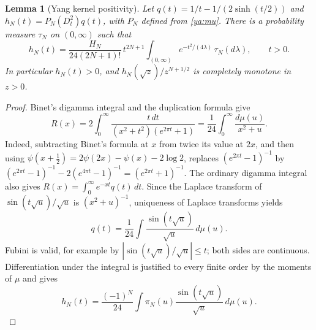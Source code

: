 \documentclass[11pt,a4paper]{article}
\newtheorem{lemma}[theorem]{Lemma}
\theoremstyle{definition}
\theoremstyle{remark}
\numberwithin{equation}{section}
\begin{document}
\begin{lemma}[Yang kernel positivity]\label{ya:kernel-positive}
Let $q(t)=1/t-1/(2\sinh(t/2))$ and
$h_N(t)=P_N(D_t^2)q(t)$, with $P_N$ defined from \eqref{ya:mu}.
There is a probability measure $\tau_N$ on $(0,\infty)$ such that
\begin{equation}\label{ya:positive-kernel}
 h_N(t)=\frac{H_N}{24(2N+1)!}\,t^{2N+1}
        \int_{(0,\infty)}e^{-t^2/(4\lambda)}
                          \,\tau_N(d\lambda),\qquad t>0.
\end{equation}
In particular $h_N(t)>0$, and
$h_N(\sqrt z)/z^{N+1/2}$ is completely monotone in $z>0$.
\end{lemma}
\begin{proof}
Binet's digamma integral and the duplication formula give
\begin{equation}\label{ya:Stieltjes}
 R(x)=2\int_0^\infty
       \frac{t\,dt}{(x^2+t^2)(e^{2\pi t}+1)}
     =\frac1{24}\int_0^\infty\frac{d\mu(u)}{x^2+u}.
\end{equation}
Indeed, subtracting Binet's formula at $x$ from twice its value at
$2x$, and then using
$\psi(x+\tfrac12)=2\psi(2x)-\psi(x)-2\log2$, replaces
$(e^{2\pi t}-1)^{-1}$ by
$(e^{2\pi t}-1)^{-1}-2(e^{4\pi t}-1)^{-1}
=(e^{2\pi t}+1)^{-1}$.
The ordinary digamma integral also gives
$R(x)=\int_0^\infty e^{-xt}q(t)\,dt$.
Since the Laplace transform of
$\sin(t\sqrt u)/\sqrt u$ is $(x^2+u)^{-1}$,
uniqueness of Laplace transforms yields
\[
 q(t)=\frac1{24}\int
       \frac{\sin(t\sqrt u)}{\sqrt u}\,d\mu(u).
\]
Fubini is valid, for example by
$|\sin(t\sqrt u)/\sqrt u|\le t$; both sides are continuous.
Differentiation under the integral is justified to every finite order
by the moments of $\mu$ and gives
\[
 h_N(t)=\frac{(-1)^N}{24}\int\pi_N(u)
                   \frac{\sin(t\sqrt u)}{\sqrt u}\,d\mu(u).
\]


\end{proof}
\end{document}

